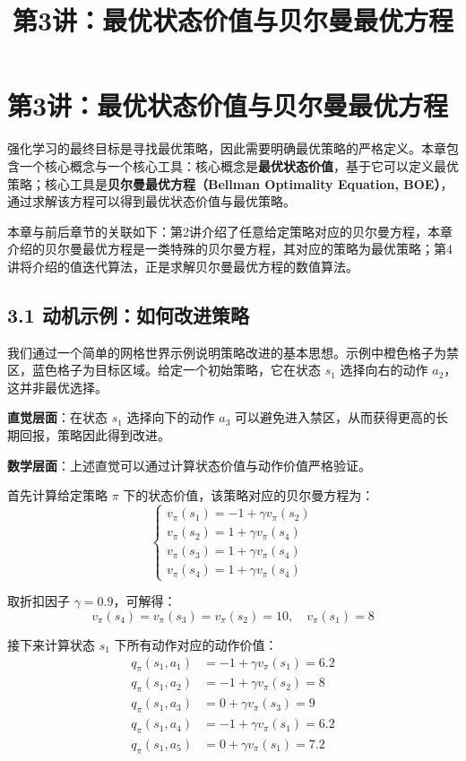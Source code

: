 \documentclass[UTF8]{article}
\title{第3讲：最优状态价值与贝尔曼最优方程}
\author{}
\date{}
\begin{document}
\maketitle
\thispagestyle{empty}

\section*{第3讲：最优状态价值与贝尔曼最优方程}

强化学习的最终目标是寻找最优策略，因此需要明确最优策略的严格定义。本章包含一个核心概念与一个核心工具：核心概念是\textbf{最优状态价值}，基于它可以定义最优策略；核心工具是\textbf{贝尔曼最优方程（Bellman Optimality Equation, BOE）}，通过求解该方程可以得到最优状态价值与最优策略。

本章与前后章节的关联如下：第2讲介绍了任意给定策略对应的贝尔曼方程，本章介绍的贝尔曼最优方程是一类特殊的贝尔曼方程，其对应的策略为最优策略；第4讲将介绍的值迭代算法，正是求解贝尔曼最优方程的数值算法。

\subsection*{3.1 动机示例：如何改进策略}

我们通过一个简单的网格世界示例说明策略改进的基本思想。示例中橙色格子为禁区，蓝色格子为目标区域。给定一个初始策略，它在状态 $s_1$ 选择向右的动作 $a_2$，这并非最优选择。

\textbf{直觉层面}：在状态 $s_1$ 选择向下的动作 $a_3$ 可以避免进入禁区，从而获得更高的长期回报，策略因此得到改进。

\textbf{数学层面}：上述直觉可以通过计算状态价值与动作价值严格验证。

首先计算给定策略 $\pi$ 下的状态价值，该策略对应的贝尔曼方程为：
\[
\begin{cases}
v_\pi(s_1) = -1 + \gamma v_\pi(s_2) \\
v_\pi(s_2) = 1 + \gamma v_\pi(s_4) \\
v_\pi(s_3) = 1 + \gamma v_\pi(s_4) \\
v_\pi(s_4) = 1 + \gamma v_\pi(s_4)
\end{cases}
\]

取折扣因子 $\gamma=0.9$，可解得：
\[
v_\pi(s_4) = v_\pi(s_3) = v_\pi(s_2) = 10, \quad v_\pi(s_1) = 8
\]

接下来计算状态 $s_1$ 下所有动作对应的动作价值：
\[
\begin{aligned}
q_\pi(s_1, a_1) &= -1 + \gamma v_\pi(s_1) = 6.2 \\
q_\pi(s_1, a_2) &= -1 + \gamma v_\pi(s_2) = 8 \\
q_\pi(s_1, a_3) &= 0 + \gamma v_\pi(s_3) = 9 \\
q_\pi(s_1, a_4) &= -1 + \gamma v_\pi(s_1) = 6.2 \\
q_\pi(s_1, a_5) &= 0 + \gamma v_\pi(s_1) = 7.2
\end{aligned}
\]
\end{document}
